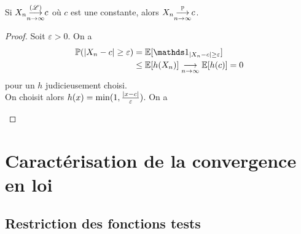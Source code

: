 \begin{proposition}
    Si \(X_n\underset{n\to\infty}{{\overset{(\mathscr{L})}{\longrightarrow}}} c\) où \(c\) est une constante, alors \(X_n\underset{n\to\infty}{{\overset{\mathbb{P}}{\longrightarrow}}} c\).
\end{proposition}

\begin{proof}
    Soit \(\varepsilon>0\). On a
    \begin{equation*}
        \begin{aligned}
            \bb P(\n{X_n-c}\geq \varepsilon)
            &= \bb E[\one_{\n{X_n-c}\geq \varepsilon}]\\
            &\leq \bb E[h(X_n)]\cvn \bb E[h(c)] = 0
        \end{aligned}
    \end{equation*}
    pour un \(h\) judicieusement choisi.\\
    On choisit alors \(h(x) = \min(1,\frac{\mathopen{}\left|x-c\right|\mathclose{}}{\varepsilon})\). On a
    \begin{center}
    \end{center}
\end{proof}

\section{Caractérisation de la convergence en loi}

\subsection{Restriction des fonctions tests}

